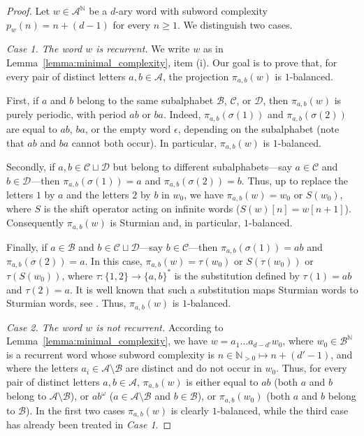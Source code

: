 \documentclass{template_arxiv}
\theoremstyle{definition}
\newcommand{\N}{\mathbb{N}}
\newcommand{\A}{\mathcal{A}}
\newcommand{\B}{\mathcal{B}}
\begin{document}
\begin{proof}
Let $w\in\A^\N$ be a $d$-ary word with subword complexity $p_w(n)=n+(d-1)$ for every $n\geq 1$. We distinguish two cases.

\medskip

\emph{Case 1. The word $w$ is recurrent.} We write $w$ as in Lemma~\ref{lemma:minimal_complexity}, item (i). Our goal is to prove that, for every pair of distinct letters $a,b\in\A$, the projection $\pi_{a,b}(w)$ is $1$-balanced.

First, if $a$ and $b$ belong to the same subalphabet $\mathcal{B}$, $\mathcal{C}$, or $\mathcal{D}$, then $\pi_{a,b}(w)$ is purely periodic, with period $ab$ or $ba$. Indeed, $\pi_{a,b}(\sigma(1))$ and $\pi_{a,b}(\sigma(2))$ are equal to $ab$, $ba$, or the empty word $\epsilon$, depending on the subalphabet (note that $ab$ and $ba$ cannot both occur). In particular, $\pi_{a,b}(w)$ is $1$-balanced.

Secondly, if $a,b\in\mathcal{C}\sqcup\mathcal{D}$ but belong to different subalphabets---say $a\in\mathcal{C}$ and $b\in\mathcal{D}$---then $\pi_{a,b}(\sigma(1))=a$ and $\pi_{a,b}(\sigma(2))=b$. Thus, up to replace the letters $1$ by $a$ and the letters $2$ by $b$ in $w_0$, we have $\pi_{a,b}(w)=w_0$ or $S(w_0)$, where $S$ is the shift operator acting on infinite words ($S(w)[n]=w[n+1]$). Consequently $\pi_{a,b}(w)$ is Sturmian and, in particular, $1$-balanced.

Finally, if $a\in\mathcal{B}$ and $b\in\mathcal{C}\sqcup\mathcal{D}$---say $b\in\mathcal{C}$---then $\pi_{a,b}(\sigma(1))=ab$ and $\pi_{a,b}(\sigma(2))=a$. In this case, $\pi_{a,b}(w)=\tau(w_0)$ or $S(\tau(w_0))$ or $\tau(S(w_0))$, where $\tau:\{1,2\}\to\{a,b\}^*$ is the substitution defined by $\tau(1)=ab$ and $\tau(2)=a$. It is well known that such a substitution maps Sturmian words to Sturmian words, see \cite[Chapter~2, Section~2.3]{Loth02}. Thus, $\pi_{a,b}(w)$ is $1$-balanced.

\medskip

\emph{Case 2. The word $w$ is not recurrent.} According to Lemma~\ref{lemma:minimal_complexity}, we have $w=a_1\ldots a_{d-d'}w_0$, where $w_0\in\B^\N$ is a recurrent word whose subword complexity is $n\in\N_{>0}\mapsto n+(d'-1)$, and where the letters $a_i\in\A\setminus\B$ are distinct and do not occur in $w_0$. Thus, for every pair of distinct letters $a,b\in\A$, $\pi_{a,b}(w)$ is either equal to $ab$ (both $a$ and $b$ belong to $\A\setminus\B$), or $ab^\omega$ ($a\in\A\setminus\B$ and $b\in\B$), or $\pi_{a,b}(w_0)$ (both $a$ and $b$ belong to $\B$). In the first two cases $\pi_{a,b}(w)$ is clearly $1$-balanced, while the third case has already been treated in \emph{Case 1}.
\end{proof}
\end{document}
